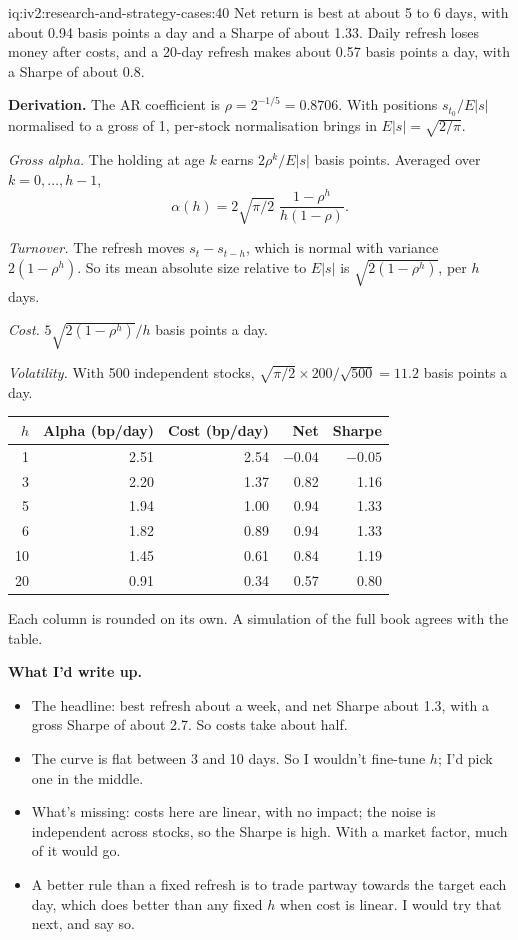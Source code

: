 \begin{solution}{iq:iv2:research-and-strategy-cases:40}
Net return is best at about 5 to 6 days, with about 0.94 basis points a day and a Sharpe of about 1.33. Daily refresh loses money after costs, and a 20-day refresh makes about 0.57 basis points a day, with a Sharpe of about 0.8.

\textbf{Derivation.} The AR coefficient is $\rho = 2^{-1/5} = 0.8706$. With positions $s_{t_0}/E|s|$ normalised to a gross of 1, per-stock normalisation brings in $E|s| = \sqrt{2/\pi}$.

\textit{Gross alpha.} The holding at age $k$ earns $2\rho^k/E|s|$ basis points. Averaged over $k = 0, \dots, h - 1$,
\[
\alpha(h) = 2\sqrt{\pi/2}\;\frac{1 - \rho^h}{h(1 - \rho)}.
\]

\textit{Turnover.} The refresh moves $s_{t} - s_{t-h}$, which is normal with variance $2(1 - \rho^h)$. So its mean absolute size relative to $E|s|$ is $\sqrt{2(1 - \rho^h)}$, per $h$ days.

\textit{Cost.} $5\sqrt{2(1 - \rho^h)}/h$ basis points a day.

\textit{Volatility.} With 500 independent stocks, $\sqrt{\pi/2} \times 200/\sqrt{500} = 11.2$ basis points a day.

\begin{center}
\begin{tabular}{rrrrr}
\toprule
$h$ & Alpha (bp/day) & Cost (bp/day) & Net & Sharpe \\
\midrule
1 & 2.51 & 2.54 & $-0.04$ & $-0.05$ \\
3 & 2.20 & 1.37 & 0.82 & 1.16 \\
5 & 1.94 & 1.00 & 0.94 & 1.33 \\
6 & 1.82 & 0.89 & 0.94 & 1.33 \\
10 & 1.45 & 0.61 & 0.84 & 1.19 \\
20 & 0.91 & 0.34 & 0.57 & 0.80 \\
\bottomrule
\end{tabular}
\end{center}

Each column is rounded on its own. A simulation of the full book agrees with the table.

\textbf{What I'd write up.}
\begin{itemize}
\item The headline: best refresh about a week, and net Sharpe about 1.3, with a gross Sharpe of about 2.7. So costs take about half.
\item The curve is flat between 3 and 10 days. So I wouldn't fine-tune $h$; I'd pick one in the middle.
\item What's missing: costs here are linear, with no impact; the noise is independent across stocks, so the Sharpe is high. With a market factor, much of it would go.
\item A better rule than a fixed refresh is to trade partway towards the target each day, which does better than any fixed $h$ when cost is linear. I would try that next, and say so.
\end{itemize}

\end{solution}
